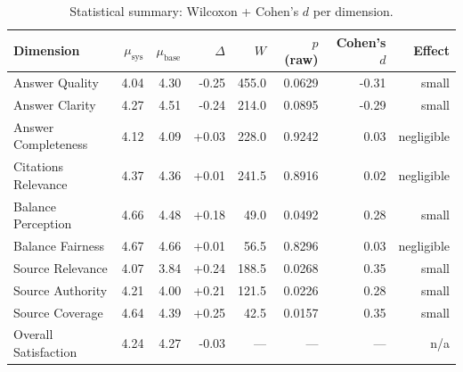 \begin{table}[htbp]
\centering
\caption{Statistical summary: Wilcoxon + Cohen's $d$ per dimension.}
\label{tab:statistical_summary}
\small
\begin{tabular}{lrrrrrrr}
\toprule
Dimension & $\mu_\text{sys}$ & $\mu_\text{base}$ & $\Delta$ & $W$ & $p$ (raw) & Cohen's $d$ & Effect \\
\midrule
Answer Quality & 4.04 & 4.30 & -0.25 & 455.0 & 0.0629 & -0.31 & small \\
Answer Clarity & 4.27 & 4.51 & -0.24 & 214.0 & 0.0895 & -0.29 & small \\
Answer Completeness & 4.12 & 4.09 & +0.03 & 228.0 & 0.9242 & 0.03 & negligible \\
Citations Relevance & 4.37 & 4.36 & +0.01 & 241.5 & 0.8916 & 0.02 & negligible \\
Balance Perception & 4.66 & 4.48 & +0.18 & 49.0 & 0.0492 & 0.28 & small \\
Balance Fairness & 4.67 & 4.66 & +0.01 & 56.5 & 0.8296 & 0.03 & negligible \\
Source Relevance & 4.07 & 3.84 & +0.24 & 188.5 & 0.0268 & 0.35 & small \\
Source Authority & 4.21 & 4.00 & +0.21 & 121.5 & 0.0226 & 0.28 & small \\
Source Coverage & 4.64 & 4.39 & +0.25 & 42.5 & 0.0157 & 0.35 & small \\
Overall Satisfaction & 4.24 & 4.27 & -0.03 & --- & --- & --- & n/a \\
\bottomrule
\end{tabular}
\end{table}